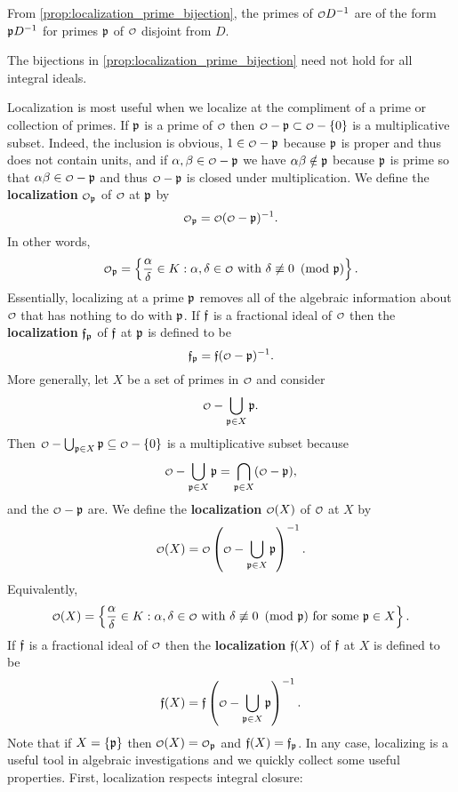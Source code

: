     From \cref{prop:localization_prime_bijection}, the primes of $\smc{O}D^{-1}$ are of the form $\mathfrak{p}D^{-1}$ for primes $\mathfrak{p}$ of $\smc{O}$ disjoint from $D$.

    \begin{remark}
      The bijections in \cref{prop:localization_prime_bijection} need not hold for all integral ideals.
    \end{remark}
    
    Localization is most useful when we localize at the compliment of a prime or collection of primes. If $\mathfrak{p}$ is a prime of $\smc{O}$ then $\smc{O}-\mf{p} \subset \smc{O}-\{0\}$ is a multiplicative subset. Indeed, the inclusion is obvious, $1 \in \smc{O}-\mf{p}$ because $\mathfrak{p}$ is proper and thus does not contain units, and if $\a,\b \in \smc{O}-\mf{p}$ we have $\alpha\beta \notin \mathfrak{p}$ because $\mathfrak{p}$ is prime so that $\a\b \in \smc{O}-\mf{p}$ and thus $\smc{O}-\mf{p}$ is closed under multiplication. We define the \textbf{localization} $\smc{O}_{\mf{p}}$ of $\smc{O}$ at $\mathfrak{p}$ by
    \[
      \smc{O}_{\mf{p}} = \smc{O}(\smc{O}-\mf{p})^{-1}.
    \]
    In other words,
    \[
      \smc{O}_{\mf{p}} = \left\{\frac{\a}{\d} \in K:\text{$\a,\d \in \smc{O}$ with $\d \not\equiv 0 \tmod{\mf{p}}$}\right\}.
    \]
    Essentially, localizing at a prime $\mathfrak{p}$ removes all of the algebraic information about $\smc{O}$ that has nothing to do with $\mathfrak{p}$. If $\mathfrak{f}$ is a fractional ideal of $\smc{O}$ then the \textbf{localization} $\mathfrak{f}_{\mathfrak{p}}$ of $\mathfrak{f}$ at $\mathfrak{p}$ is defined to be
    \[
      \mf{f}_{\mf{p}} = \mf{f}(\smc{O}-\mf{p})^{-1}.
    \]
    More generally, let $X$ be a set of primes in $\smc{O}$ and consider
    \[
      \smc{O}-\bigcup_{\mf{p} \in X}\mf{p}.
    \]
    Then $\smc{O}-\bigcup_{\mf{p} \in X}\mf{p} \subseteq \smc{O}-\{0\}$ is a multiplicative subset because
    \[
      \smc{O}-\bigcup_{\mf{p} \in X}\mf{p} = \bigcap_{\mf{p} \in X}(\smc{O}-\mf{p}),
    \]
    and the $\smc{O}-\mf{p}$ are. We define the \textbf{localization} $\smc{O}(X)$ of $\smc{O}$ at $X$ by
    \[
      \smc{O}(X) = \smc{O}\left(\smc{O}-\bigcup_{\mf{p} \in X}\mf{p}\right)^{-1}.
    \]
    Equivalently,
    \[
      \smc{O}(X) = \left\{\frac{\a}{\d} \in K:\text{$\a,\d \in \smc{O}$ with $\d \not\equiv 0 \tmod{\mf{p}}$ for some $\mf{p} \in X$}\right\}.
    \]
    If $\mathfrak{f}$ is a fractional ideal of $\smc{O}$ then the \textbf{localization} $\mathfrak{f}(X)$ of $\mathfrak{f}$ at $X$ is defined to be
    \[
      \mf{f}(X) = \mf{f}\left(\smc{O}-\bigcup_{\mf{p} \in X}\mf{p}\right)^{-1}.
    \]
    Note that if $X = \{\mathfrak{p}\}$ then $\smc{O}(X) = \smc{O}_{\mf{p}}$ and $\mathfrak{f}(X) = \mathfrak{f}_{\mathfrak{p}}$. In any case, localizing is a useful tool in algebraic investigations and we quickly collect some useful properties. First, localization respects integral closure:

